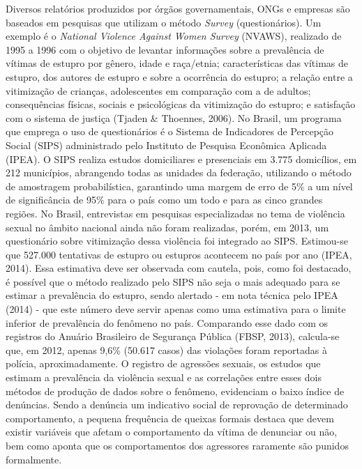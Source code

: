 Diversos relatórios produzidos por órgãos governamentais, ONGs e empresas são baseados em pesquisas que utilizam o método \textit{Survey} (questionários). Um exemplo é o \textit{National Violence Against Women Survey} (NVAWS), realizado de 1995 a 1996 com o objetivo de levantar informações sobre a prevalência de vítimas de estupro por gênero, idade e raça/etnia; características das vítimas de estupro, dos autores de estupro e sobre a ocorrência do estupro; a relação entre a vitimização de crianças, adolescentes em comparação com a de adultos; consequências físicas, sociais e psicológicas da vitimização do estupro; e satisfação com o sistema de justiça (Tjaden \& Thoennes, 2006). No Brasil, um programa que emprega o uso de questionários é o Sistema de Indicadores de Percepção Social (SIPS) administrado pelo Instituto de Pesquisa Econômica Aplicada (IPEA). O SIPS realiza estudos domiciliares e presenciais em 3.775 domicílios, em 212 municípios, abrangendo todas as unidades da federação, utilizando o método de amostragem probabilística, garantindo uma margem de erro de 5\% a um nível de significância de 95\% para o país como um todo e para as cinco grandes regiões. No Brasil, entrevistas em pesquisas especializadas no tema de violência sexual no âmbito nacional ainda não foram realizadas, porém, em 2013, um questionário sobre vitimização dessa violência foi integrado ao SIPS. Estimou-se que 527.000 tentativas de estupro ou estupros acontecem no país por ano (IPEA, 2014). Essa estimativa deve ser observada com cautela, pois, como foi destacado, é possível que o método realizado pelo SIPS não seja o mais adequado para se estimar a prevalência do estupro, sendo alertado - em nota técnica pelo IPEA (2014) - que este número deve servir apenas como uma estimativa para o limite inferior de prevalência do fenômeno no país. Comparando esse dado com os registros do Anuário Brasileiro de Segurança Pública (FBSP, 2013), calcula-se que, em 2012, apenas 9,6\% (50.617 casos) das violações foram reportadas à polícia, aproximadamente. O registro de agressões sexuais, os estudos que estimam a prevalência da violência sexual e as correlações entre esses dois métodos de produção de dados sobre o fenômeno, evidenciam o baixo índice de denúncias. Sendo a denúncia um indicativo social de reprovação de determinado comportamento, a pequena frequência de queixas formais destaca que devem existir variáveis que afetam o comportamento da vítima de denunciar ou não, bem como aponta que os comportamentos dos agressores raramente são punidos formalmente.

